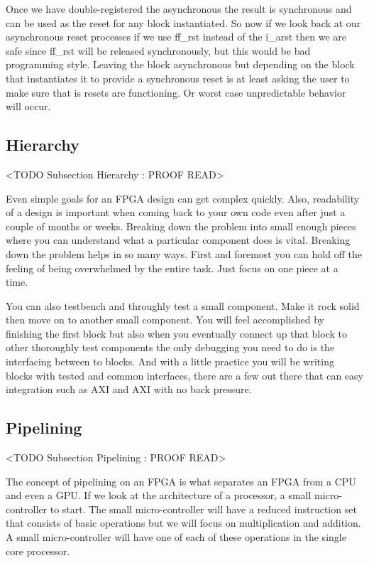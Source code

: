 Once we have double-registered the asynchronous the result is synchronous and can be used as the reset for any block instantiated. So now if we look back at our asynchronous reset processes if we use ff\_rst instead of the i\_arst then we are safe since ff\_rst will be released synchronously, but this would be bad programming style. Leaving the block asynchronous but depending on the block that instantiates it to provide a synchronous reset is at least asking the user to make sure that is resets are functioning. Or worst case unpredictable behavior will occur. 
		
		
\subsection{Hierarchy} 
	<TODO Subsection Hierarchy : PROOF READ>

Even simple goals for an \ac{FPGA} design can get complex quickly. Also, readability of a design is important when coming back to your own code even after just a couple of months or weeks. Breaking down the problem into small enough pieces where you can understand what a particular component does is vital. Breaking down the problem helps in so many ways. First and foremost you can hold off the feeling of being overwhelmed by the entire task. Just focus on one piece at a time. 

You can also testbench and throughly test a small component. Make it rock solid then move on to another small component. You will feel accomplished by finishing the first block but also when you eventually connect up that block to other thoroughly test components the only debugging you need to do is the interfacing between to blocks. And with a little practice you will be writing blocks with tested and common interfaces, there are a few out there that can easy integration such as \ac{AXI} and \ac{AXI} with no back pressure. 
	
\subsection{Pipelining}
	<TODO Subsection Pipelining : PROOF READ>
	
The concept of pipelining on an \ac{FPGA} is what separates an \ac{FPGA} from a \ac{CPU} and even a \ac{GPU}. If we look at the architecture of a processor, a small micro-controller to start. The small micro-controller will have a reduced instruction set that consists of basic operations but we will focus on multiplication and addition. A small micro-controller will have one of each of these operations in the single core processor.

